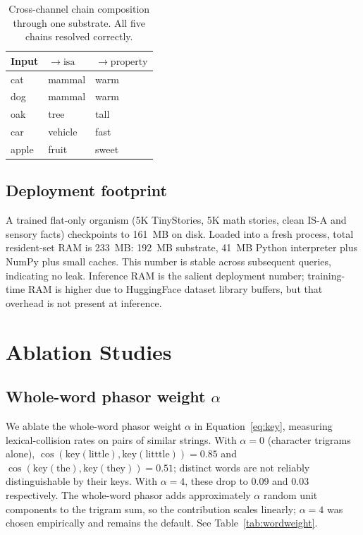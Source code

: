 \documentclass[11pt,a4paper]{article}
\begin{document}
\begin{table}[t]
  \centering
  \caption{Cross-channel chain composition through one substrate.
  All five chains resolved correctly.}
  \label{tab:chain}
  \begin{tabular}{lll}
    \toprule
    Input & $\to \mathrm{isa}$ & $\to \mathrm{property}$ \\
    \midrule
    cat   & mammal  & warm  \\
    dog   & mammal  & warm  \\
    oak   & tree    & tall  \\
    car   & vehicle & fast  \\
    apple & fruit   & sweet \\
    \bottomrule
  \end{tabular}
\end{table}

\subsection{Deployment footprint}

A trained flat-only organism (5K TinyStories, 5K math stories, clean
IS-A and sensory facts) checkpoints to 161~MB on disk.  Loaded into a
fresh process, total resident-set RAM is 233~MB:  192~MB substrate,
41~MB Python interpreter plus NumPy plus small caches.  This number is
stable across subsequent queries, indicating no leak.  Inference RAM
is the salient deployment number;  training-time RAM is higher due to
HuggingFace dataset library buffers, but that overhead is not present
at inference.

\section{Ablation Studies}
\label{sec:ablation}

\subsection{Whole-word phasor weight $\alpha$}
We ablate the whole-word phasor weight $\alpha$ in Equation~\ref{eq:key},
measuring lexical-collision rates on pairs of similar strings.
With $\alpha = 0$ (character trigrams alone),
$\cos(\mathrm{key}(\text{little}), \mathrm{key}(\text{litttle})) = 0.85$
and $\cos(\mathrm{key}(\text{the}), \mathrm{key}(\text{they})) = 0.51$;
distinct words are not reliably distinguishable by their keys.  With
$\alpha = 4$, these drop to 0.09 and 0.03 respectively.  The whole-word
phasor adds approximately $\alpha$ random unit components to the
trigram sum, so the contribution scales linearly;  $\alpha = 4$ was
chosen empirically and remains the default.  See Table~\ref{tab:wordweight}.
\end{document}

